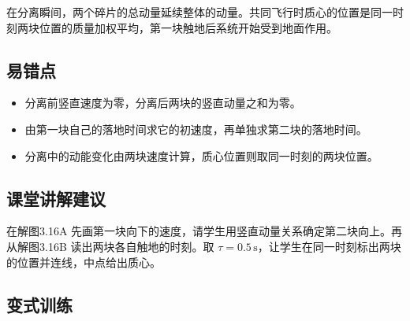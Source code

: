 \documentclass[UTF8,fontset=fandol,a4paper,11pt]{ctexart}
\begin{document}
在分离瞬间，两个碎片的总动量延续整体的动量。共同飞行时质心的位置是同一时刻两块位置的质量加权平均，第一块触地后系统开始受到地面作用。



\subsection*{易错点}

\begin{itemize}
\item 分离前竖直速度为零，分离后两块的竖直动量之和为零。
\item 由第一块自己的落地时间求它的初速度，再单独求第二块的落地时间。
\item 分离中的动能变化由两块速度计算，质心位置则取同一时刻的两块位置。
\end{itemize}



\subsection*{课堂讲解建议}

在解图3.16A 先画第一块向下的速度，请学生用竖直动量关系确定第二块向上。再从解图3.16B 读出两块各自触地的时刻。取 $\tau=0.5\,\mathrm s$，让学生在同一时刻标出两块的位置并连线，中点给出质心。



\subsection*{变式训练}
\end{document}
